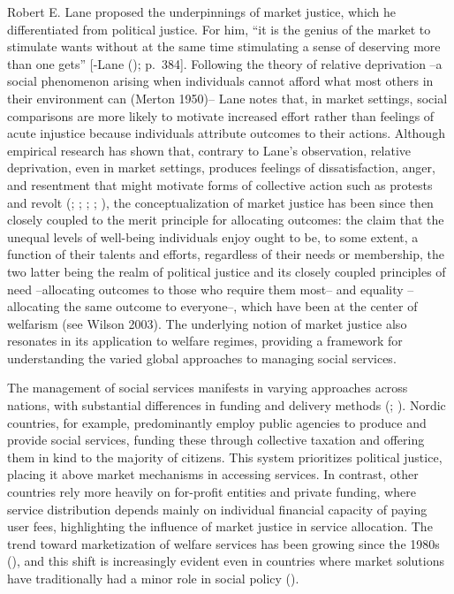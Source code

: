 \documentclass[
  letterpaper,
  DIV=11,
  numbers=noendperiod]{scrartcl}
\begin{document}
Robert E. Lane proposed the underpinnings of market justice, which he
differentiated from political justice. For him, ``it is the genius of
the market to stimulate wants without at the same time stimulating a
sense of deserving more than one gets'' {[}-Lane
(); p.~384{]}. Following the theory
of relative deprivation --a social phenomenon arising when individuals
cannot afford what most others in their environment can (Merton 1950)--
Lane notes that, in market settings, social comparisons are more likely
to motivate increased effort rather than feelings of acute injustice
because individuals attribute outcomes to their actions. Although
empirical research has shown that, contrary to Lane's observation,
relative deprivation, even in market settings, produces feelings of
dissatisfaction, anger, and resentment that might motivate forms of
collective action such as protests and revolt
(; ;
;
;
), the conceptualization of market justice has been since then
closely coupled to the merit principle for allocating outcomes: the
claim that the unequal levels of well-being individuals enjoy ought to
be, to some extent, a function of their talents and efforts, regardless
of their needs or membership, the two latter being the realm of
political justice and its closely coupled principles of need
--allocating outcomes to those who require them most-- and equality
--allocating the same outcome to everyone--, which have been at the
center of welfarism (see Wilson 2003). The underlying notion of market
justice also resonates in its application to welfare regimes, providing
a framework for understanding the varied global approaches to managing
social services.

The management of social services manifests in varying approaches across
nations, with substantial differences in funding and delivery methods
(;
). Nordic countries, for
example, predominantly employ public agencies to produce and provide
social services, funding these through collective taxation and offering
them in kind to the majority of citizens. This system prioritizes
political justice, placing it above market mechanisms in accessing
services. In contrast, other countries rely more heavily on for-profit
entities and private funding, where service distribution depends mainly
on individual financial capacity of paying user fees, highlighting the
influence of market justice in service allocation. The trend toward
marketization of welfare services has been growing since the 1980s
(), and this
shift is increasingly evident even in countries where market solutions
have traditionally had a minor role in social policy
().
\end{document}
